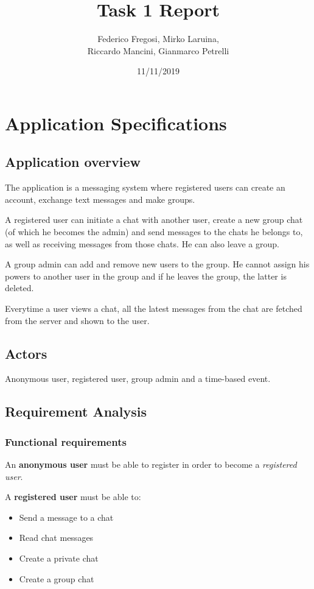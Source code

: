 \documentclass[10pt]{article}
\title{Task 1 Report}
\date{11/11/2019}
\author{Federico Fregosi, Mirko Laruina,\\
        Riccardo Mancini, Gianmarco Petrelli}
\begin{document}
\maketitle
\vfill
\tableofcontents
\vfill
\clearpage
\setcounter{page}{1}

\section{Application Specifications}
\subsection{Application overview}
The application is a messaging system where registered users can create an 
account, exchange text messages and make groups.

A registered user can initiate a chat with another user, create a new group chat
(of which he becomes the admin) and send messages to the chats he belongs to,
as well as receiving messages from those chats. He can also leave a group.

A group admin can add and remove new users to the group. He cannot assign his
powers to another user in the group and if he leaves the group, the latter 
is deleted.

Everytime a user views a chat, all the latest messages from the chat are fetched from 
the server and shown to the user.

\subsection{Actors}
Anonymous user, registered user, group admin and a time-based event.

\subsection{Requirement Analysis}
\subsubsection{Functional requirements}

An \textbf{anonymous user} must be able to register in order to become a 
\emph{registered user}.

A \textbf{registered user} must be able to:
\begin{itemize}
    \item Send a message to a chat
    \item Read chat messages
    \item Create a private chat
    \item Create a group chat
\end{itemize}
\end{document}
